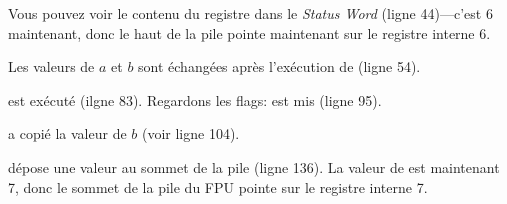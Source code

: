 Vous pouvez voir le contenu du registre  dans le \emph{Status Word} (ligne 44)---c'est
6 maintenant, donc le haut de la pile pointe maintenant sur le registre interne 6.

Les valeurs de $a$ et $b$ sont échangées après l'exécution de  (ligne 54).

 est exécuté (ilgne 83).
Regardons les flags: \CF est mis (ligne 95).

 a copié la valeur de $b$ (voir ligne 104).

\FSTP dépose une valeur au sommet de la pile (ligne 136).
La valeur de  est maintenant 7, donc le sommet de la pile du FPU pointe
sur le registre interne 7.

